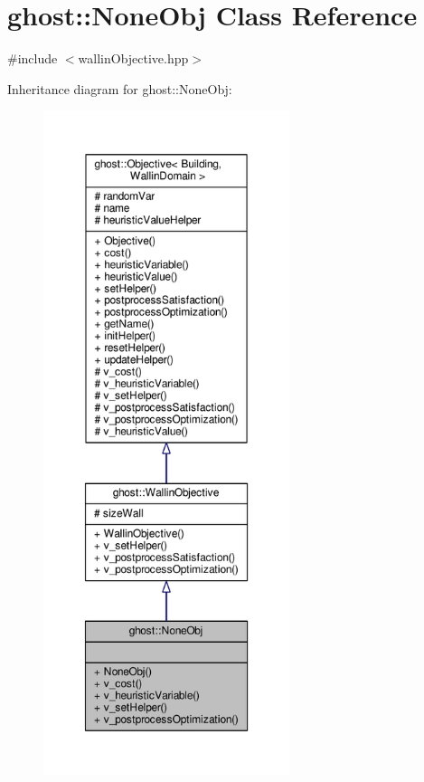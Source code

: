 \hypertarget{classghost_1_1NoneObj}{\section{ghost\-:\-:None\-Obj Class Reference}
\label{classghost_1_1NoneObj}
}


{\ttfamily \#include $<$wallin\-Objective.\-hpp$>$}



Inheritance diagram for ghost\-:\-:None\-Obj\-:\nopagebreak
\begin{figure}[H]
\begin{center}
\leavevmode
\includegraphics[height=550pt]{classghost_1_1NoneObj__inherit__graph}
\end{center}
\end{figure}



